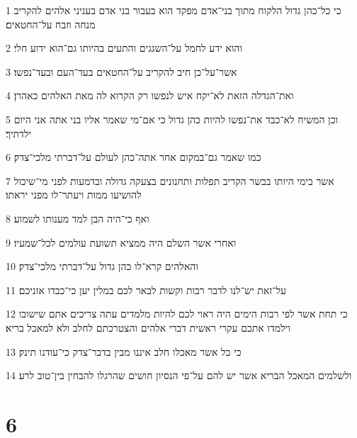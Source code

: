\par 1 כי כל־כהן גדול הלקוח מתוך בני־אדם מפקד הוא בעבור בני אדם בעניני אלהים להקריב מנחה וזבח על־החטאים׃
\par 2 והוא ידע לחמל על־השגגים והתעים בהיותו גם־הוא ידוע חלי׃
\par 3 אשר־על־כן חיב להקריב על־החטאים בעד־העם ובעד־נפשו׃
\par 4 ואת־הגדלה הזאת לא־יקח איש לנפשו רק הקרוא לה מאת האלהים כאהרן׃
\par 5 וכן המשיח לא־כבד את־נפשו להיות כהן גדול כי אם־מי שאמר אליו בני אתה אני היום ילדתיך׃
\par 6 כמו שאמר גם־במקום אחר אתה־כהן לעולם על־דברתי מלכי־צדק׃
\par 7 אשר בימי היותו בבשר הקריב תפלות ותחנונים בצעקה גדולה ובדמעות לפני מי־שיכול להושיעו ממות ויעתר־לו מפני יראתו׃
\par 8 ואף כי־היה הבן למד מענותו לשמוע׃
\par 9 ואחרי אשר השלם היה ממציא תשועת עולמים לכל־שמעיו׃
\par 10 והאלהים קרא־לו כהן גדול על־דברתי מלכי־צדק׃
\par 11 על־זאת יש־לנו לדבר רבות וקשות לבאר לכם במלין יען כי־כבדו אזניכם׃
\par 12 כי תחת אשר לפי רבות הימים היה ראוי לכם להיות מלמדים עתה צריכים אתם שישובו וילמדו אתכם עקרי ראשית דברי אלהים והצטרכתם לחלב ולא למאכל בריא׃
\par 13 כי כל אשר מאכלו חלב איננו מבין בדבר־צדק כי־עודנו תינק׃
\par 14 ולשלמים המאכל הבריא אשר יש להם על־פי הנסיון חושים שהרגלו להבחין בין־טוב לרע׃

\chapter{6}


